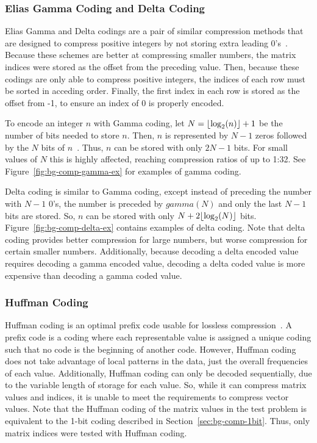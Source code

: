 \subsubsection{Elias Gamma Coding and Delta Coding}
Elias Gamma and Delta codings are a pair of similar compression methods that are designed to compress positive integers by not storing extra leading 0's~\cite{Elias:1975:codeword}.
Because these schemes are better at compressing smaller numbers, the matrix indices were stored as the offset from the preceding value.
Then, because these codings are only able to compress positive integers, the indices of each row must be sorted in acceding order.
Finally, the first index in each row is stored as the offset from -1, to ensure an index of 0 is properly encoded.

To encode an integer \(n\) with Gamma coding, let \(N = \lfloor\log_2(n)\rfloor+1\) be the number of bits needed to store \(n\).
Then, \(n\) is represented by \(N-1\) zeros followed by the \(N\) bits of \(n\)~\cite{Elias:1975:codeword}.
Thus, \(n\) can be stored with only \(2N-1\) bits.
For small values of \(N\) this is highly affected, reaching compression ratios of up to 1:32.
See Figure~\ref{fig:bg-comp-gamma-ex} for examples of gamma coding.



Delta coding is similar to Gamma coding, except instead of preceding the number with \(N-1\) 0's, the number is preceded by \(gamma(N)\) and only the last \(N-1\) bits are stored.
So, \(n\) can be stored with only \(N + 2\lfloor\log_2(N)\rfloor\) bits.
Figure~\ref{fig:bg-comp-delta-ex} contains examples of delta coding.
Note that delta coding provides better compression for large numbers, but worse compression for certain smaller numbers.
Additionally, because decoding a delta encoded value requires decoding a gamma encoded value, decoding a delta coded value is more expensive than decoding a gamma coded value.



\subsubsection{Huffman Coding}
\label{sec:bg-comp-huffman}
Huffman coding is an optimal prefix code usable for lossless compression~\cite{Huffman:1952:coding}.
A prefix code is a coding where each representable value is assigned a unique coding such that no code is the beginning of another code.
However, Huffman coding does not take advantage of local patterns in the data, just the overall frequencies of each value.
Additionally, Huffman coding can only be decoded sequentially, due to the variable length of storage for each value.
So, while it can compress matrix values and indices, it is unable to meet the requirements to compress vector values.
Note that the Huffman coding of the matrix values in the test problem is equivalent to the 1-bit coding described in Section~\ref{sec:bg-comp-1bit}.
Thus, only matrix indices were tested with Huffman coding.

